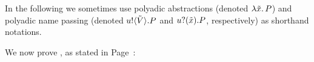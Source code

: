 
%			
%
In the following we sometimes use polyadic abstractions 
(denoted $\lambda \tilde{x}.\,P$)
and polyadic name passing 
(denoted $u ! \langle \tilde{V} \rangle .{P}$ and  $u ? (\tilde{x}) .{P}$, respectively)
as shorthand notations. 








We now prove , as stated in Page~\pageref{lem:tau_inert}:


